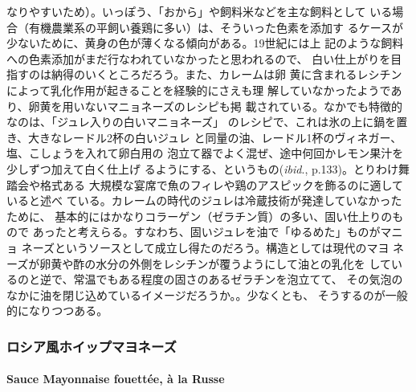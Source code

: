 \begin{recette}
{  なりやすいため）。いっぽう、「おから」や飼料米などを主な飼料として
  いる場合（有機農業系の平飼い養鶏に多い）は、そういった色素を添加す
  るケースが少ないために、黄身の色が薄くなる傾向がある。19世紀には上
  記のような飼料への色素添加がまだ行なわれていなかったと思われるので、
  白い仕上がりを目指すのは納得のいくところだろう。また、カレームは卵
  黄に含まれるレシチンによって乳化作用が起きることを経験的にさえも理
  解していなかったようであり、卵黄を用いないマニョネーズのレシピも掲
  載されている。なかでも特徴的なのは、「ジュレ入りの白いマニョネーズ」
  のレシピで、これは氷の上に鍋を置き、大きなレードル2杯の白いジュレ
  と同量の油、レードル1杯のヴィネガー、塩、こしょうを入れて卵白用の
  泡立て器でよく混ぜ、途中何回かレモン果汁を少しずつ加えて白く仕上げ
  るようにする、というもの(\emph{ibid}.,
  p.133)。とりわけ舞踏会や格式ある
  大規模な宴席で魚のフィレや鶏のアスピックを飾るのに適していると述べ
  ている。カレームの時代のジュレは冷蔵技術が発達していなかったために、
  基本的にはかなりコラーゲン（ゼラチン質）の多い、固い仕上りのもので
  あったと考えらる。すなわち、固いジュレを油で「ゆるめた」ものがマニョ
  ネーズというソースとして成立し得たのだろう。構造としては現代のマヨ
  ネーズが卵黄や酢の水分の外側をレシチンが覆うようにして油との乳化を
  しているのと逆で、常温でもある程度の固さのあるゼラチンを泡立てて、
  その気泡のなかに油を閉じ込めているイメージだろうか。}。少なくとも、
そうするのが一般的になりつつある。

\maeaki

\hypertarget{ux30edux30b7ux30a2ux98a8ux30dbux30a4ux30c3ux30d7ux30deux30e8ux30cdux30fcux30ba}{%
\subsubsection{ロシア風ホイップマヨネーズ}\label{ux30edux30b7ux30a2ux98a8ux30dbux30a4ux30c3ux30d7ux30deux30e8ux30cdux30fcux30ba}}

\hypertarget{mayonnaise-fouette-a-la-russe}{%
\paragraph{Sauce Mayonnaise fouettée, à la
Russe}\label{mayonnaise-fouette-a-la-russe}}



\end{recette}
